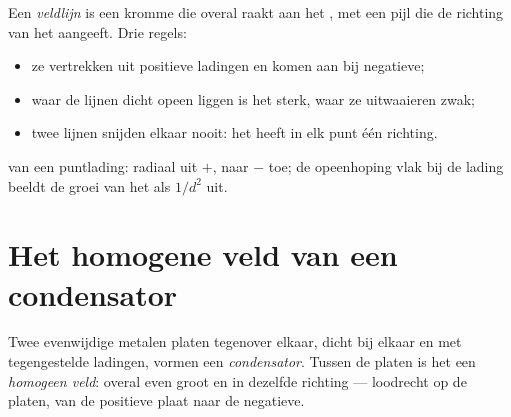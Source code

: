 \begin{definition}[Veldlijnen]\label{def:g11:electric-gravitational-fields:lines}
Een \emph{veldlijn} is een kromme die overal raakt aan
het , met een pijl die de richting van het  aangeeft. Drie
regels:
\begin{itemize}
  \item ze vertrekken uit positieve ladingen en komen aan bij negatieve;
  \item waar de lijnen dicht opeen liggen is het  sterk, waar ze
        uitwaaieren zwak;
  \item twee lijnen snijden elkaar nooit: het  heeft in elk punt één
        richting.
\end{itemize}
\end{definition}

\begin{omfigure}
\qquad\qquad
{}

{\small {} van een puntlading: radiaal uit $+$, naar $-$ toe; de
opeenhoping vlak bij de lading beeldt de groei van het  als $1/d^2$
uit.}
\end{omfigure}

\section{Het homogene veld van een condensator}

\begin{definition}[Vlakkeplaatcondensator]\label{def:g11:electric-gravitational-fields:capacitor}
Twee evenwijdige metalen platen tegenover elkaar, dicht bij elkaar en met
tegengestelde ladingen, vormen een \emph{condensator}.
Tussen de platen is het  een \emph{homogeen veld}: overal even groot en in dezelfde richting --- loodrecht op de
platen, van de positieve plaat naar de negatieve.
\end{definition}

